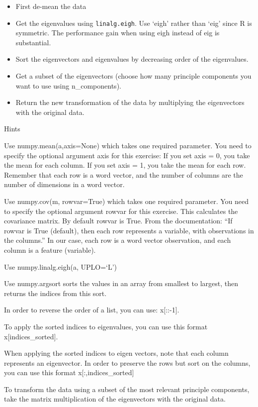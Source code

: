 \documentclass[11pt]{article}
\providecommand{\tightlist}{%
      \setlength{\itemsep}{0pt}\setlength{\parskip}{0pt}}
\begin{document}
\begin{itemize}
\tightlist
\item
  First de-mean the data
\item
  Get the eigenvalues using \texttt{linalg.eigh}. Use `eigh' rather than
  `eig' since R is symmetric. The performance gain when using eigh
  instead of eig is substantial.
\item
  Sort the eigenvectors and eigenvalues by decreasing order of the
  eigenvalues.
\item
  Get a subset of the eigenvectors (choose how many principle components
  you want to use using n\_components).
\item
  Return the new transformation of the data by multiplying the
  eigenvectors with the original data.
\end{itemize}

    Hints

Use numpy.mean(a,axis=None) which takes one required parameter. You need
to specify the optional argument axis for this exercise: If you set axis
= 0, you take the mean for each column. If you set axis = 1, you take
the mean for each row. Remember that each row is a word vector, and the
number of columns are the number of dimensions in a word vector.

Use numpy.cov(m, rowvar=True) which takes one required parameter. You
need to specify the optional argument rowvar for this exercise. This
calculates the covariance matrix. By default rowvar is True. From the
documentation: ``If rowvar is True (default), then each row represents a
variable, with observations in the columns.'' In our case, each row is a
word vector observation, and each column is a feature (variable).

Use numpy.linalg.eigh(a, UPLO=`L')

Use numpy.argsort sorts the values in an array from smallest to largest,
then returns the indices from this sort.

In order to reverse the order of a list, you can use: x{[}::-1{]}.

To apply the sorted indices to eigenvalues, you can use this format
x{[}indices\_sorted{]}.

When applying the sorted indices to eigen vectors, note that each column
represents an eigenvector. In order to preserve the rows but sort on the
columns, you can use this format x{[}:,indices\_sorted{]}

To transform the data using a subset of the most relevant principle
components, take the matrix multiplication of the eigenvectors with the
original data.
\end{document}
